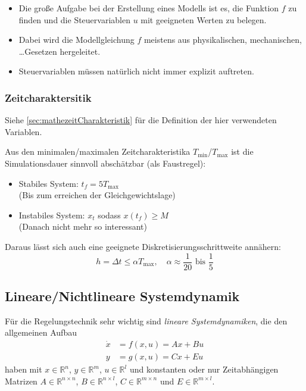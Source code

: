 			\begin{itemize}
				\item Die große Aufgabe bei der Erstellung eines Modells ist es, die Funktion \(f\) zu finden und die Steuervariablen \(u\) mit geeigneten Werten zu belegen.
				\item Dabei wird die Modellgleichung \(f\) meistens aus physikalischen, mechanischen, \dots Gesetzen hergeleitet.
				\item Steuervariablen müssen natürlich nicht immer explizit auftreten.
			\end{itemize}

			\subsubsection{Zeitcharaktersitik} %
				Siehe \ref{sec:mathezeitCharakteristik} für die Definition der hier verwendeten Variablen.

				Aus den minimalen/maximalen Zeitcharakteristika \( T _ {\min} \)/\( T _ {\max} \) ist die Simulationsdauer sinnvoll abschätzbar (als Faustregel):
				\begin{itemize}
					\item Stabiles System: \( t _ f = 5 T _ {\max} \) \\ (Bis zum erreichen der Gleichgewichtslage)
					\item Instabiles System: \(x_t\) sodass \( x(t _ f) \geq M \) \\ (Danach nicht mehr so interessant)
				\end{itemize}
				Daraus lässt sich auch eine geeignete Diskretisierungsschrittweite annähern:
				\begin{equation*}
					h = \Delta t \leq \alpha T _ {\max}, \quad \alpha \approx \frac{1}{20} \text{ bis } \frac{1}{5}
				\end{equation*}

		\subsection{Lineare/Nichtlineare Systemdynamik} %
			Für die Regelungstechnik sehr wichtig sind \textit{lineare Systemdynamiken}, die den allgemeinen Aufbau
			\begin{align*}
				\dot{x} & = f(x, u) = Ax + Bu \\
				y       & = g(x, u) = Cx + Eu
			\end{align*}
			haben mit \( x \in \mathbb{R} ^ n \), \( y \in \mathbb{R} ^ m \), \( u \in \mathbb{R} ^ l \) und konstanten oder nur Zeitabhängigen Matrizen \( A \in \mathbb{R} ^ { n \times n } \), \( B \in \mathbb{R} ^ { n \times l } \), \( C \in \mathbb{R} ^ { m \times n } \) und \( E \in \mathbb{R} ^ { m \times l } \).

